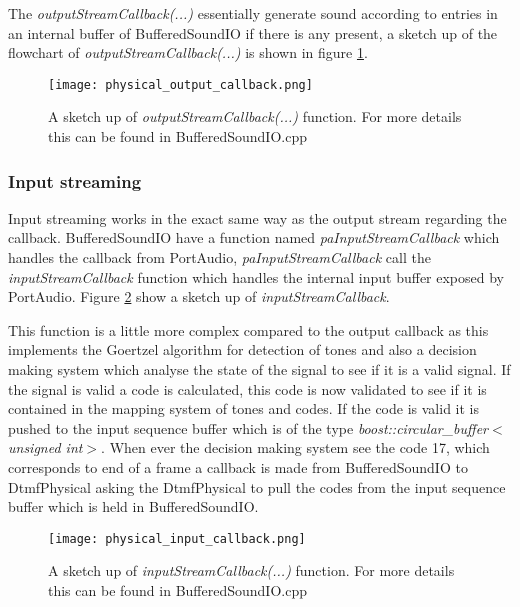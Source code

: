 		The \textit{outputStreamCallback(...)} essentially generate sound according to entries in an internal buffer of BufferedSoundIO
		if there is any present, a sketch up of the flowchart of \textit{outputStreamCallback(...)} is shown in figure \ref{fig:physical_output_callback}.
		
		\begin{figure}[htb]
			\begin{center}
			\texttt{[image: physical\_output\_callback.png]}%
			\caption{A sketch up of \textit{outputStreamCallback(...)} function. For more details this can be found in BufferedSoundIO.cpp}
			\label{fig:physical_output_callback}
			\end{center}
		\end{figure}
		
		\subsubsection{Input streaming}
		Input streaming works in the exact same way as the output stream regarding the callback. BufferedSoundIO have a function named
		\textit{paInputStreamCallback} which handles the callback from PortAudio, \textit{paInputStreamCallback} call the \textit{inputStreamCallback}
		function which handles the internal input buffer exposed by PortAudio. Figure \ref{fig:physical_input_callback} show a sketch up of \textit{inputStreamCallback}.
		
		This function is a little more complex compared to the output callback as this implements the Goertzel algorithm for detection of tones and also
		a decision making system which analyse the state of the signal to see if it is a valid signal. If the signal is valid a code is calculated, this
		code is now validated to see if it is contained in the mapping system of tones and codes. If the code is valid it is pushed to the input
		sequence buffer which is of the type \textit{boost::circular\_buffer$<$unsigned int$>$}. When ever the decision making system see the code 17,
		which corresponds to end of a frame a callback is made from BufferedSoundIO to DtmfPhysical asking the DtmfPhysical to pull the codes from
		the input sequence buffer which is held in BufferedSoundIO.
		
		\begin{figure}[htb]
			\begin{center}
			\texttt{[image: physical\_input\_callback.png]}%
			\caption{A sketch up of \textit{inputStreamCallback(...)} function. For more details this can be found in BufferedSoundIO.cpp}
			\label{fig:physical_input_callback}
			\end{center}
		\end{figure}
		
